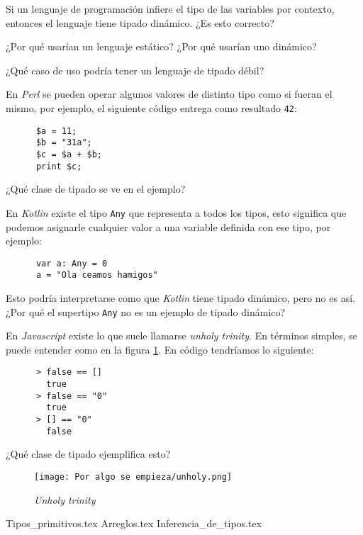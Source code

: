   \begin{exercise}
    Si un lenguaje de programación infiere el tipo de las variables por contexto, entonces el 
    lenguaje tiene tipado dinámico.
    ¿Es esto correcto?
  \end{exercise}

  \begin{exercise}
    ¿Por qué usarían un lenguaje estático?
    ¿Por qué usarían uno dinámico?
  \end{exercise}

  \begin{exercise}
    ¿Qué caso de uso podría tener un lenguaje de tipado débil?
  \end{exercise}

  \begin{exercise}
    En \textit{Perl} se pueden operar algunos valores de distinto tipo como si fueran el mismo,
    por ejemplo, el siguiente código entrega como resultado \texttt{42}:
    \begin{verbatim}
      $a = 11;
      $b = "31a";
      $c = $a + $b;
      print $c;
    \end{verbatim}

    ¿Qué clase de tipado se ve en el ejemplo?
  \end{exercise}
  
  \begin{exercise}
    En \textit{Kotlin} existe el tipo \texttt{Any} que representa a todos los tipos, 
    esto significa que podemos asignarle cualquier valor a una variable definida con ese tipo, por
    ejemplo:

    \begin{verbatim}
      var a: Any = 0
      a = "Ola ceamos hamigos"
    \end{verbatim}

    Esto podría interpretarse como que \textit{Kotlin} tiene tipado dinámico, pero no es así.
    ¿Por qué el supertipo \texttt{Any} no es un ejemplo de tipado dinámico?
  \end{exercise}

  \begin{exercise}
    En \textit{Javascript} existe lo que suele llamarse \textit{unholy trinity}.
    En términos simples, se puede entender como en la figura \ref{fig:unholy}.
    En código tendríamos lo siguiente:
    \begin{verbatim}
      > false == [] 
        true
      > false == "0"
        true
      > [] == "0"
        false
    \end{verbatim}

    ¿Qué clase de tipado ejemplifica esto?
  \end{exercise}

  \begin{figure}[ht!]
    \centering
    \texttt{[image: Por algo se empieza/unholy.png]}
    \caption{\textit{Unholy trinity}}
    \label{fig:unholy}
  \end{figure}

  {Tipos_primitivos.tex}
  {Arreglos.tex}
  {Inferencia_de_tipos.tex}